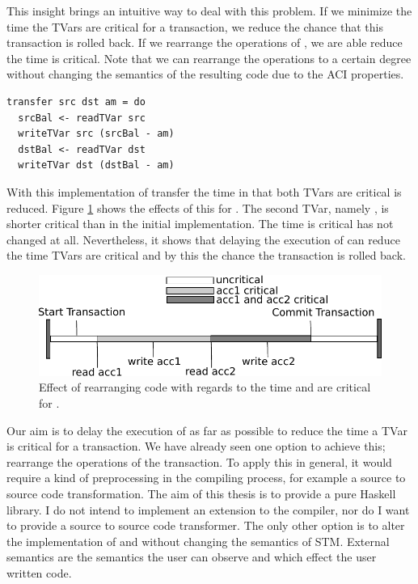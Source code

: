 This insight brings an intuitive way to deal with this problem. If we minimize the time the TVars are critical for
a transaction, we reduce the chance that this transaction is rolled back. 
If we rearrange the operations of , we are able reduce the time  is critical. Note that we 
can rearrange the operations to a certain degree without changing the semantics of the resulting code due to the ACI 
properties. 
\begin{lstlisting}
transfer src dst am = do 
  srcBal <- readTVar src
  writeTVar src (srcBal - am)
  dstBal <- readTVar dst
  writeTVar dst (dstBal - am)
\end{lstlisting}
With this implementation of transfer the time in that both TVars are critical is reduced. Figure \ref{fig:criticalValue2}
shows the effects of this for . The second TVar, namely , is shorter critical than in the 
initial implementation. The time  is critical has not changed at all. Nevertheless, it shows that delaying the
execution of  can reduce the time TVars are critical and by this the chance the transaction is rolled back.
\begin{figure}
\centering
\includegraphics{Figures/CriticalValue2}
\decoRule
\caption[Critical Value II]{Effect of rearranging code with regards to the time  and  are critical for .}
\label{fig:criticalValue2}
\end{figure}
Our aim is to delay the execution of  as far as possible to reduce the time 
a TVar is critical for a transaction. We have already seen one option to achieve this; rearrange the 
operations of the transaction. To apply this in general, it would require a kind of preprocessing in the compiling process, for 
example a source to source code transformation. The aim of this thesis is to provide a pure Haskell
library. I do not intend to implement an extension to the compiler, nor do I 
want to provide a source to source code transformer. The only other option is to alter the implementation
of  and  without changing the  semantics of STM. 
External semantics are the semantics the user can observe and which effect the user written code.

